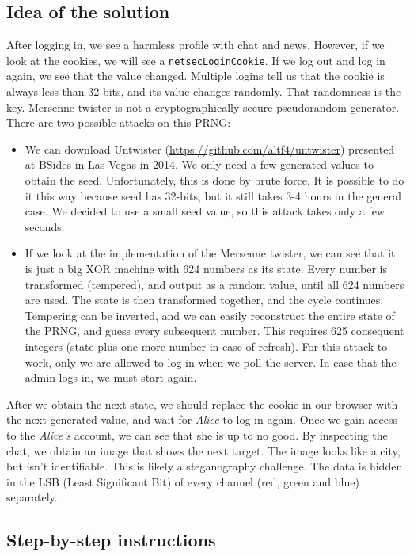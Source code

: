 \documentclass[11pt]{article}
\begin{document}
\subsection{Idea of the solution}
After logging in, we see a harmless profile with chat and news. However, if we look at the cookies, we will see a \texttt{netsecLoginCookie}. If we log out and log in again, we see that the value changed. Multiple logins tell us that the cookie is always less than 32-bits, and its value changes randomly. That randomness is the key. Mersenne twister is not a cryptographically secure pseudorandom generator. There are two possible attacks on this PRNG:
\begin{itemize}
\item We can download Untwister (\url{https://github.com/altf4/untwister}) presented at BSides in Las Vegas in 2014. We only need a few generated values to obtain the seed. Unfortunately, this is done by brute force. It is possible to do it this way because seed has 32-bits, but it still takes 3-4 hours in the general case. We decided to use a small seed value, so this attack takes only a few seconds.
\item  If we look at the implementation of the Mersenne twister, we can see that it is just a big XOR machine with 624 numbers as its state. Every number is transformed (tempered), and output as a random value, until all 624 numbers are used. The state is then transformed together, and the cycle continues. Tempering can be inverted, and we can easily reconstruct the entire state of the PRNG, and guess every subsequent number. This requires 625 consequent integers (state plus one more number in case of refresh). For this attack to work, only we are allowed to log in when we poll the server. In case that the admin logs in, we must start again.
\end{itemize}
After we obtain the next state, we should replace the cookie in our browser with the next generated value, and wait for \textit{Alice} to log in again. Once we gain access to the \textit{Alice's} account, we can see that she is up to no good. By inspecting the chat, we obtain an image that shows the next target. The image looks like a city, but isn't identifiable. This is likely a steganography challenge. The data is hidden in the LSB (Least Significant Bit) of every channel (red, green and blue) separately.

\subsection{Step-by-step instructions}
\end{document}
